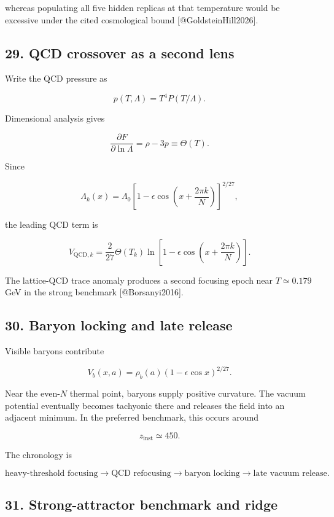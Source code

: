 \documentclass[
]{article}
\begin{document}
whereas populating all five hidden replicas at that temperature would be
excessive under the cited cosmological bound {[}@GoldsteinHill2026{]}.

\hypertarget{qcd-crossover-as-a-second-lens}{%
\subsection{29. QCD crossover as a second
lens}\label{qcd-crossover-as-a-second-lens}}

Write the QCD pressure as

\[
p(T,\Lambda)=T^4P(T/\Lambda).
\]

Dimensional analysis gives

\[
\frac{\partial F}{\partial\ln\Lambda}=\rho-3p\equiv\Theta(T).
\]

Since

\[
\Lambda_k(x)=\Lambda_0
\left[1-\epsilon\cos\left(x+\frac{2\pi k}{N}\right)\right]^{2/27},
\]

the leading QCD term is

\[
\boxed{
V_{{\mathrm{QCD}},k}
=\frac{2}{27}\Theta(T_k)
\ln\left[1-\epsilon\cos\left(x+\frac{2\pi k}{N}\right)\right].
}
\]

The lattice-QCD trace anomaly produces a second focusing epoch near
\(T\simeq0.179\) GeV in the strong benchmark {[}@Borsanyi2016{]}.

\hypertarget{baryon-locking-and-late-release}{%
\subsection{30. Baryon locking and late
release}\label{baryon-locking-and-late-release}}

Visible baryons contribute

\[
V_b(x,a)=\rho_b(a)(1-\epsilon\cos x)^{2/27}.
\]

Near the even-\(N\) thermal point, baryons supply positive curvature.
The vacuum potential eventually becomes tachyonic there and releases the
field into an adjacent minimum. In the preferred benchmark, this occurs
around

\[
z_{\mathrm{inst}}\simeq450.
\]

The chronology is

\[
\boxed{
\text{heavy-threshold focusing}
\rightarrow
\text{QCD refocusing}
\rightarrow
\text{baryon locking}
\rightarrow
\text{late vacuum release}.
}
\]

\hypertarget{strong-attractor-benchmark-and-ridge}{%
\subsection{31. Strong-attractor benchmark and
ridge}\label{strong-attractor-benchmark-and-ridge}}
\end{document}
